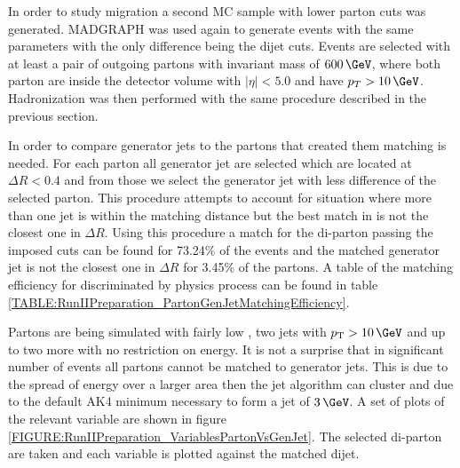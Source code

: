 In order to study migration a second \gls{MC} sample with lower parton cuts was generated. \textsc{MADGRAPH} was used again to generate events with the same parameters with the only difference being the dijet cuts. Events are selected with at least a pair of outgoing partons with invariant mass of $600\,\GeV$, where both parton are inside the detector volume with $|\eta|<5.0$ and have $p_{T}>10\,\GeV$. Hadronization was then performed with the same procedure described in the previous section.

In order to compare generator jets to the partons that created them matching is needed. For each parton all generator jet are selected which are located at $\Delta R < 0.4$ and from those we select the generator jet with less difference of \pt the selected parton. This procedure attempts to account for situation where more than one jet is within the matching distance but the best match in \pt is not the closest one in $\Delta R$. Using this procedure a match for the di-parton passing the imposed cuts can be found for 73.24\% of the events and the matched generator jet is not the closest one in $\Delta R$ for 3.45\% of the partons. A table of the matching efficiency for discriminated by physics process can be found in table \ref{TABLE:RunIIPreparation_PartonGenJetMatchingEfficiency}. 



Partons are being simulated with fairly low \pt, two jets with $\pt > 10\,\GeV$ and up to two more with no restriction on energy. It is not a surprise that in significant number of events all partons cannot be matched to generator jets. This is due to the spread of energy over a larger area then the jet algorithm can cluster and due to the default AK4 minimum \pt necessary to form a jet of $3\,\GeV$. A set of plots of the relevant variable are shown in figure \ref{FIGURE:RunIIPreparation_VariablesPartonVsGenJet}. The selected di-parton are taken and each variable is plotted against the matched dijet.


